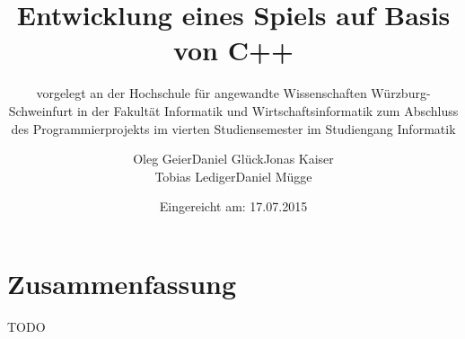 \documentclass[12pt,oneside,a4paper,parskip]{scrbook}
\def\BaAuthor{Oleg Geier\qquad Daniel Glück\qquad Jonas Kaiser \\Tobias Lediger\qquad Daniel Mügge}
\def\BaTitle{Entwicklung eines Spiels auf Basis von C++}
\def\BaSupervisorOne{Prof.\ Dr.\ Peter Braun}
\def\BaSupervisorTwo{Prof.\ Dr.\ Steffen Heinzl}
\def\BaDeadline{17.07.2015}
\begin{document}


\frontmatter
\titlehead{%
  {Hochschule für angewandte Wissenschaften Würzburg-Schweinfurt\\
   Fakultät Informatik und Wirtschaftsinformatik}}
\subject{Projektdokumentation}
\title{\BaTitle\\[15mm]}
\subtitle{\normalsize{vorgelegt an der Hochschule f\"{u}r angewandte Wissenschaften W\"{u}rzburg-Schweinfurt in der Fakult\"{a}t Informatik und Wirtschaftsinformatik zum Abschluss des Programmierprojekts im vierten Studiensemester im Studiengang Informatik}}
\author{\BaAuthor}
\date{\normalsize{Eingereicht am: \BaDeadline}}
\publishers{
  \normalsize{Erstpr\"{u}fer: \BaSupervisorOne}\\
  \normalsize{Zweitpr\"{u}fer: \BaSupervisorTwo}\\
}


\maketitle



\section*{Zusammenfassung}

TODO

\tableofcontents										



\mainmatter









\backmatter

\listoffigures
{}			

\listoftables

\lstlistoflistings
{}				

\printbibliography
{}				
\end{document}
